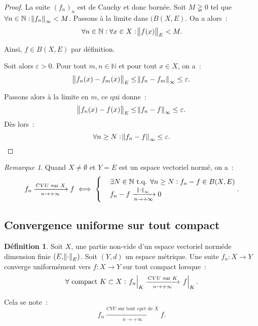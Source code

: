 \documentclass{report}
\theoremstyle{definition}
\newtheorem{déf}[thm]{Définition}
\theoremstyle{remark}
\newtheorem*{rmq}{Remarque}
\numberwithin{equation}{section}
\newcommand{\N}{\mathbb N}
\newcommand{\tq}{\text{ t.q. }}
\newcommand{\CONV}[5]{\xrightarrow[#2 \to #3]{#4 \text{ #5 } #1}}
\newcommand{\CVU}[3]{\CONV{#1}{#2}{#3}{CVU}{sur}}
\newcommand{\CVUc}[3]{\CONV{#1}{#2}{#3}{CVU}{sur tout cpct de}}
\newcommand{\restr}[2]{\left.#1\vphantom{\big|}\right|_{#2}}
\newcommand{\pinfty}{{+\infty}}
\newcommand{\evn}{espace vectoriel normé}
\begin{document}
\begin{proof}
			La suite $(f_n)_n$ est de Cauchy et donc bornée. Soit $M \gneqq 0$ tel que $\forall n \in \N : \norm {f_n}_\infty < M$. Passons à la limite dans
			$(B(X, E)$. On a alors~:
			\begin{equation}
				\forall n \in \N : \forall x \in X : \norm {f(x)}_E < M.
			\end{equation}

			Ainsi, $f \in B(X, E)$ par définition.

			Soit alors $\varepsilon > 0$. Pour tout $m, n \in \N$ et pour tout $x \in X$, on a~:
			\begin{equation}
				\norm {f_n(x) - f_m(x)}_E  \leq \norm {f_n - f_m}_\infty \leq \varepsilon.
			\end{equation}

			Passons alors à la limite en $m$, ce qui donne~:
			\begin{equation}
				\norm {f_n(x) - f(x)}_E \leq \norm {f_n - f}_\infty \leq \varepsilon.
			\end{equation}
			Dès lors~:
			\begin{equation}
				\forall n \geq N : \norm {f_n - f}_\infty \leq \varepsilon.
			\end{equation}
			\end{proof}

			\begin{rmq} Quand $X \neq \emptyset$ et $Y = E$ est un \evn, on a~:
			\begin{equation}
				f_n \CVU Xn\pinfty f \iff
				\begin{cases}&\exists N \in \N \tq \forall n \geq N : f_n - f \in B(X, E) \\ &f_n - f \xrightarrow[n \to \pinfty]{\norm \cdot_\infty} 0\end{cases}.
			\end{equation}
			\end{rmq}

		\subsection{Convergence uniforme sur tout compact}
			\begin{déf} Soit $X$, une partie non-vide d'un \evn de dimension finie $(E, \norm \cdot_E)$. Soit $(Y, d)$ un espace métrique.
			Une suite $f_n : X \to Y$ converge uniformément vers $f : X \to Y$ sur tout compact lorsque~:
			\begin{equation}
				\forall \text{ compact } K \subset X : \restr {f_n}K \CVU Kn\pinfty \restr fK.
			\end{equation}

			Cela se note~:
			\begin{equation}
				f_n \CVUc Xn\pinfty f.
			\end{equation}
			\end{déf}
\end{document}
